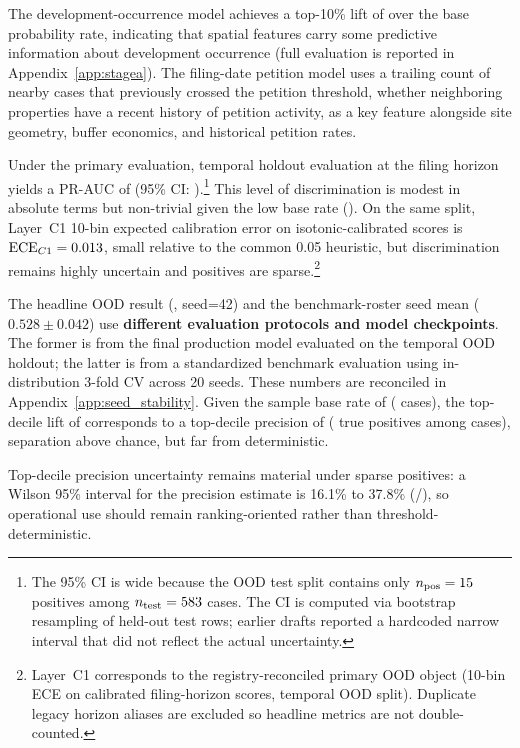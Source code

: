 \documentclass[11pt, letterpaper]{article}
\begin{document}
The development-occurrence model achieves a top-10\% lift of \metricHazardLift{} over the base probability rate, indicating that spatial features carry some predictive information about development occurrence (full evaluation is reported in Appendix~\ref{app:stagea}). The filing-date petition model uses a trailing count of nearby cases that previously crossed the petition threshold, whether neighboring properties have a recent history of petition activity, as a key feature alongside site geometry, buffer economics, and historical petition rates.

Under the primary evaluation, temporal holdout evaluation at the filing horizon yields a PR-AUC of \metricBootstrapFiling{} (95\% CI: \metricBootstrapFilingCI{}).\footnote{The 95\% CI is wide because the OOD test split contains only $n_{\text{pos}} = 15{}$ positives among $n_{\text{test}}=583{}$ cases. The CI is computed via bootstrap resampling of held-out test rows; earlier drafts reported a hardcoded narrow interval that did not reflect the actual uncertainty.} This level of discrimination is modest in absolute terms but non-trivial given the low base rate (\metricBaseRate{}). On the same split, Layer~C1 10-bin expected calibration error on isotonic-calibrated scores is $\text{ECE}_{C1}=0.013{}$, small relative to the common 0.05 heuristic, but discrimination remains highly uncertain and positives are sparse.\footnote{Layer~C1 corresponds to the registry-reconciled primary OOD object (10-bin ECE on calibrated filing-horizon scores, temporal OOD split). Duplicate legacy horizon aliases are excluded so headline metrics are not double-counted.}

The headline OOD result (\metricBootstrapFiling{}, seed=42) and the benchmark-roster seed mean ($0.528 \pm 0.042$) use \textbf{different evaluation protocols and model checkpoints}. The former is from the final production model evaluated on the temporal OOD holdout; the latter is from a standardized benchmark evaluation using in-distribution 3-fold CV across 20 seeds. These numbers are reconciled in Appendix~\ref{app:seed_stability}. Given the sample base rate of \metricBaseRate{} (\metricBaseRateN{} cases), the top-decile lift of \metricTopDecileLift{} corresponds to a top-decile precision of \metricTopDecilePrecision{} (\metricTopDecileTP{} true positives among \metricTopDecileN{} cases), separation above chance, but far from deterministic.

Top-decile precision uncertainty remains material under sparse positives: a Wilson 95\% interval for the precision estimate is 16.1\% to 37.8\% (\metricTopDecileTP{}/\metricTopDecileN{}), so operational use should remain ranking-oriented rather than threshold-deterministic.
\end{document}

